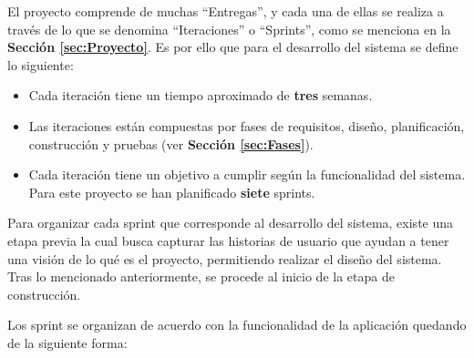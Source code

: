 El proyecto comprende de muchas ``Entregas'', y cada una de ellas se realiza a través de lo que se denomina ``Iteraciones'' o ``Sprints'', como se menciona en la \textbf{Sección \ref{sec:Proyecto}}. Es por ello que para el desarrollo del sistema se define lo siguiente:

\begin{itemize}
    \item Cada iteración tiene un tiempo aproximado de \textbf{tres} semanas.
    \item Las iteraciones están compuestas por fases de requisitos, diseño, planificación, construcción y pruebas (ver \textbf{Sección \ref{sec:Fases}}).
    \item Cada iteración tiene un objetivo a cumplir según la funcionalidad del sistema. Para este proyecto se han planificado \textbf{siete} sprints.
\end{itemize}

Para organizar cada sprint que corresponde al desarrollo del sistema, existe una etapa previa la cual busca capturar las historias de usuario que ayudan a tener una visión de lo qué es el proyecto, permitiendo realizar el diseño del sistema. Tras lo mencionado anteriormente, se procede al inicio de la etapa de construcción.

Los sprint se organizan de acuerdo con la funcionalidad de la aplicación quedando de la siguiente forma:

